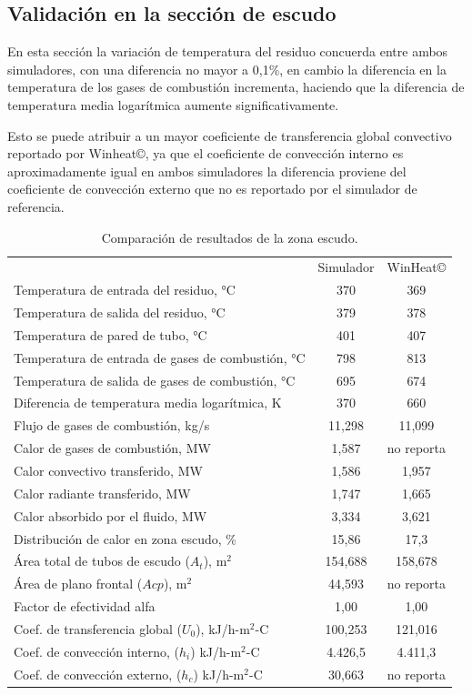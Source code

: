 \subsection{Validación en la sección de escudo}
\par En esta sección la variación de temperatura del residuo concuerda entre ambos simuladores, con una diferencia no mayor a 0,1\%, en cambio la diferencia en la temperatura de los gases de combustión incrementa, haciendo que la diferencia de temperatura media logarítmica aumente significativamente.
\par Esto se puede atribuir a un mayor coeficiente de transferencia global convectivo reportado por Winheat\copyright, ya que el coeficiente de convección interno es aproximadamente igual en ambos simuladores la diferencia proviene del coeficiente de convección externo que no es reportado por el simulador de referencia.
\begin{table}[H] \begin{center}
\caption[Resultados de la zona escudo]{Comparación de resultados de la zona escudo.}
\label{tbl:compara-ze} \begin{tabular}{l|c|c}
	& Simulador & WinHeat\copyright \\
Temperatura de entrada del residuo, °C	& 370 & 369	\\
Temperatura de salida del residuo, °C	& 379 & 378	\\
Temperatura de pared de tubo, °C		& 401 & 407	\\
Temperatura de entrada de gases de combustión, °C	& 798 & 813	\\
Temperatura de salida de gases de combustión, °C	& 695 & 674	\\
Diferencia de temperatura media logarítmica, K	& 370 & 660 \\
\hline
Flujo de gases de combustión, kg/s	& 11,298 & 11,099	\\
Calor de gases de combustión, MW	& 1,587 & no reporta \\
Calor convectivo transferido, MW	& 1,586 & 1,957	\\
Calor radiante transferido, MW		& 1,747 & 1,665	\\
Calor absorbido por el fluido, MW	& 3,334 & 3,621	\\
Distribución de calor en zona escudo, \%& 15,86 &  17,3 \\
\hline
Área total de tubos de escudo ($A_t$), m$^2$& 154,688 & 158,678 \\
Área de plano frontal ($Acp$), m$^2$	   & 44,593 & no reporta \\
Factor de efectividad alfa			       & 1,00 & 1,00 \\
\hline
Coef. de transferencia global ($U_0$), kJ/h-m$^2$-C	& 100,253  & 121,016 \\
Coef. de convección interno, ($h_i$) kJ/h-m$^2$-C	& 4.426,5 & 4.411,3 \\
Coef. de convección externo, ($h_c$) kJ/h-m$^2$-C	& 30,663 & no reporta \\
\end{tabular} \end{center} \end{table}

